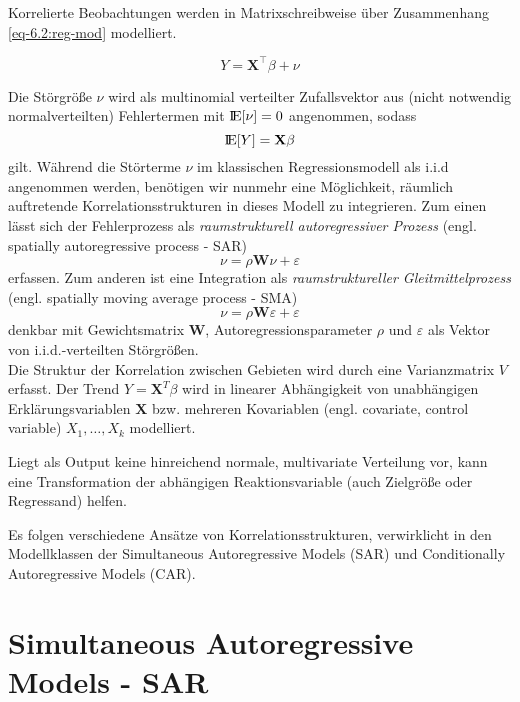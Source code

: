 Korrelierte Beobachtungen werden in Matrixschreibweise über Zusammenhang \eqref{eq-6.2:reg-mod} modelliert.

\begin{equation} \label{eq-6.2:reg-mod}
    {Y} = \mathbf{X}^{\top} \beta + \nu 
\end{equation}

Die Störgröße $\nu$ wird als multinomial verteilter Zufallsvektor aus (nicht notwendig normalverteilten) Fehlertermen 
mit ${\rm I\!E}[\nu]=0$ angenommen, sodass
\begin{equation*}
    {\rm I\!E}[Y]=\mathbf{X} \beta
\end{equation*}
gilt.
Während die Störterme $\nu$ im klassischen Regressionsmodell als i.i.d angenommen werden, benötigen wir nunmehr 
eine Möglichkeit, räumlich auftretende Korrelationsstrukturen in dieses Modell zu integrieren. Zum einen 
lässt sich der Fehlerprozess als \emph{raumstrukturell autoregressiver Prozess} 
(engl. spatially autoregressive process - SAR)
\begin{equation*}
    \nu = \rho \mathbf{W} \nu + \varepsilon
\end{equation*}
erfassen. Zum anderen ist eine Integration als \emph{raumstruktureller Gleitmittelprozess} (engl. spatially 
moving average process - SMA)
\begin{equation*}
    \nu = \rho \mathbf{W} \varepsilon + \varepsilon
\end{equation*}
denkbar mit Gewichtsmatrix $\mathbf{W}$, Autoregressionsparameter $\rho$ und $\varepsilon$ als 
Vektor von i.i.d.-verteilten Störgrößen. \\

Die Struktur der Korrelation zwischen Gebieten wird durch eine Varianzmatrix $V$ erfasst.
Der Trend $Y = \mathbf{X}^{T} \beta$ wird in linearer 
Abhängigkeit von unabhängigen Erklärungsvariablen $\mathbf{X}$ bzw. mehreren 
Kovariablen (engl. covariate, control variable) $X_1,\ldots,X_k$ modelliert.  

Liegt als Output keine hinreichend normale, multivariate Verteilung vor, kann eine Transformation der 
abhängigen Reaktionsvariable (auch Zielgröße oder Regressand) helfen. 

Es folgen verschiedene Ansätze von Korrelationsstrukturen, verwirklicht in den Modellklassen 
der Simultaneous Autoregressive Models (SAR) und Conditionally Autoregressive Models (CAR).

\section{Simultaneous Autoregressive Models - SAR}


